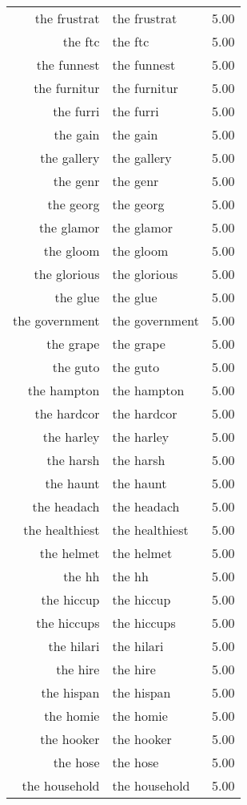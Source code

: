 \begin{table}[ht]
\begin{tabular}{rlr}
  the frustrat & the frustrat & 5.00 \\ 
  the ftc & the ftc & 5.00 \\ 
  the funnest & the funnest & 5.00 \\ 
  the furnitur & the furnitur & 5.00 \\ 
  the furri & the furri & 5.00 \\ 
  the gain & the gain & 5.00 \\ 
  the gallery & the gallery & 5.00 \\ 
  the genr & the genr & 5.00 \\ 
  the georg & the georg & 5.00 \\ 
  the glamor & the glamor & 5.00 \\ 
  the gloom & the gloom & 5.00 \\ 
  the glorious & the glorious & 5.00 \\ 
  the glue & the glue & 5.00 \\ 
  the government & the government & 5.00 \\ 
  the grape & the grape & 5.00 \\ 
  the guto & the guto & 5.00 \\ 
  the hampton & the hampton & 5.00 \\ 
  the hardcor & the hardcor & 5.00 \\ 
  the harley & the harley & 5.00 \\ 
  the harsh & the harsh & 5.00 \\ 
  the haunt & the haunt & 5.00 \\ 
  the headach & the headach & 5.00 \\ 
  the healthiest & the healthiest & 5.00 \\ 
  the helmet & the helmet & 5.00 \\ 
  the hh & the hh & 5.00 \\ 
  the hiccup & the hiccup & 5.00 \\ 
  the hiccups & the hiccups & 5.00 \\ 
  the hilari & the hilari & 5.00 \\ 
  the hire & the hire & 5.00 \\ 
  the hispan & the hispan & 5.00 \\ 
  the homie & the homie & 5.00 \\ 
  the hooker & the hooker & 5.00 \\ 
  the hose & the hose & 5.00 \\ 
  the household & the household & 5.00 \\ 

\end{tabular}
\end{table}
